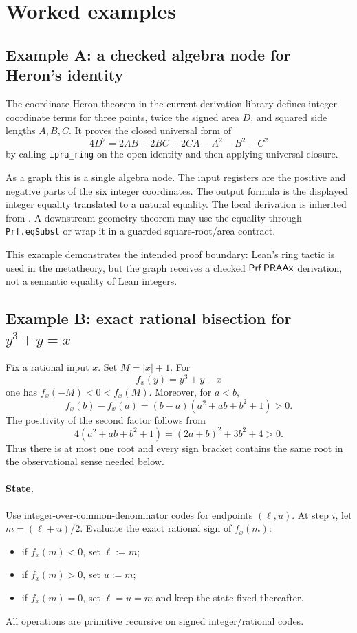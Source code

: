 \section{Worked examples}\label{sec:examples}

\subsection{Example A: a checked algebra node for Heron's identity}

The coordinate Heron theorem in the current derivation library defines integer-coordinate terms for three points, twice the signed area \(D\), and squared side lengths \(A,B,C\).  It proves the closed universal form of
\[
 4D^2=2AB+2BC+2CA-A^2-B^2-C^2
\]
by calling \texttt{ipra\_ring} on the open identity and then applying universal closure.

As a \KIFCR graph this is a single algebra node.  The input registers are the positive and negative parts of the six integer coordinates.  The output formula is the displayed integer equality translated to a natural equality.  The local derivation is inherited from .  A downstream geometry theorem may use the equality through \texttt{Prf.eqSubst} or wrap it in a guarded square-root/area contract.

This example demonstrates the intended proof boundary: Lean's ring tactic is used in the metatheory, but the graph receives a checked \(\mathsf{Prf}\,\mathsf{PRAAx}\) derivation, not a semantic equality of Lean integers.

\subsection{\texorpdfstring{Example B: exact rational bisection for \(y^3+y=x\)}{Example B: exact rational bisection for y cubed plus y equals x}}

Fix a rational input \(x\).  Set \(M=|x|+1\).  For
\[
 f_x(y)=y^3+y-x
\]
one has \(f_x(-M)<0<f_x(M)\).  Moreover, for \(a<b\),
\[
 f_x(b)-f_x(a)
 =(b-a)(a^2+ab+b^2+1)>0.
\]
The positivity of the second factor follows from
\[
 4(a^2+ab+b^2+1)=(2a+b)^2+3b^2+4>0.
\]
Thus there is at most one root and every sign bracket contains the same root in the observational sense needed below.

\paragraph{State.}
Use integer-over-common-denominator codes for endpoints \((\ell,u)\).  At step \(i\), let \(m=(\ell+u)/2\).  Evaluate the exact rational sign of \(f_x(m)\):
\begin{itemize}
  \item if \(f_x(m)<0\), set \(\ell:=m\);
  \item if \(f_x(m)>0\), set \(u:=m\);
  \item if \(f_x(m)=0\), set \(\ell=u=m\) and keep the state fixed thereafter.
\end{itemize}
All operations are primitive recursive on signed integer/rational codes.

